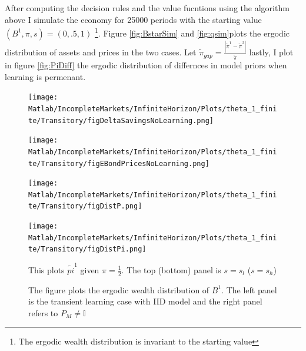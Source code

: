 \documentclass[12pt]{article}
\begin{document}
\noindent After computing the decision rules and the value fucntions using the algorithm above I simulate the economy for 25000 periods with the starting value $(B^1,\pi,s)= (0,.5,1)$ \footnote{The ergodic wealth distribution is invariant to the starting value}. Figure \ref{fig:BstarSim} and \ref{fig:qsim}plots the ergodic distribution of assets and prices in the two cases. Let  $\tilde{\pi}_{gap}=\frac{|\tilde{\pi}^1-\tilde{\pi}^2|}{\tilde{\pi}}$ lastly, I plot in figure \ref{fig:PiDiff} the ergodic distribution of differnces in model priors when learning is permenant. 

\begin{figure}[htbp]
\centering
	  \texttt{[image: Matlab/IncompleteMarkets/InfiniteHorizon/Plots/theta\_1\_finite/Transitory/figDeltaSavingsNoLearning.png]}

	\caption{ }
 
	\label{fig:DeltaSavingsNoLearning}
\end{figure} 



\begin{figure}[htbp]
\centering
	  \texttt{[image: Matlab/IncompleteMarkets/InfiniteHorizon/Plots/theta\_1\_finite/Transitory/figEBondPricesNoLearning.png]}

	\caption{ }
 
	\label{fig:figEBondPricesNoLearning}
\end{figure} 



\begin{figure}[htbp]
\centering
	  \texttt{[image: Matlab/IncompleteMarkets/InfiniteHorizon/Plots/theta\_1\_finite/Transitory/figDistP.png]}

	\caption{ }
 
	\label{fig:figDistP}
\end{figure} 



\begin{figure}[htbp]
\centering
	  \texttt{[image: Matlab/IncompleteMarkets/InfiniteHorizon/Plots/theta\_1\_finite/Transitory/figDistPi.png]}

	\caption{ This plots $\tilde{pi}^1$ given $\pi=\frac{1}{2}$. The top (bottom) panel is $s=s_l$ ($s=s_h$)}
 
	\label{fig:figDistPi}
\end{figure} 

\begin{figure}[htbp]
\centering
{}
\caption{\small {The figure plots the ergodic wealth distribution of $B^1$. The left panel is the transient learning case with IID model and the right panel refers to $P_M\neq\mathbb{I}$}}
\end{figure} 
\end{document}
